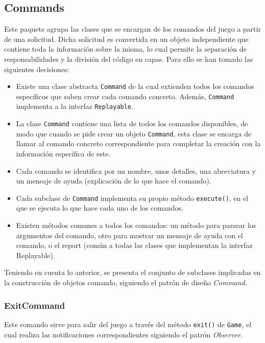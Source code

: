\documentclass[../DocumentoOficial.tex]{subfiles}
\begin{document}
\newpage

\subsection{Commands}

Este paquete agrupa las clases que se encargan de los comandos del juego a partir de una solicitud. Dicha solicitud es convertida en un objeto independiente que contiene toda la información sobre la misma, lo cual permite la separación de responsabilidades y la división del código en capas. Para ello se han tomado las siguientes decisiones:

\begin{itemize}
\item Existe una clase abstracta \texttt{Command} de la cual extienden todos los comandos específicos que saben crear cada comando concreto. Además, \texttt{Command} implementa a la interfaz \texttt{Replayable}.
\item La clase \texttt{Command} contiene una lista de todos los comandos disponibles, de modo que cuando se pide crear un objeto \texttt{Command}, esta clase se encarga de llamar al comando concreto correspondiente para completar la creación con la información específica de este.
\item Cada comando se identifica por un nombre, unos detalles, una abreviatura y un mensaje de ayuda (explicación de lo que hace el comando).
\item Cada subclase de \texttt{Command} implementa su propio método \texttt{execute()}, en el que se ejecuta lo que hace cada uno de los comandos.
\item Existen métodos comunes a todos los comandos: un método para parsear los argumentos del comando, otro para mostrar un mensaje de ayuda con el comando, o el report (común a todas las clases que implementan la interfaz Replayable).
\end{itemize}

Teniendo en cuenta lo anterior, se presenta el conjunto de subclases implicadas en la construcción de objetos comando, siguiendo el patrón de diseño \textit{Command}.

\subsubsection{ExitCommand}

Este comando sirve para salir del juego a través del método \texttt{exit()} de \texttt{Game}, el cual realiza las notificaciones correspondientes siguiendo el patrón \textit{Observer}.
\end{document}
